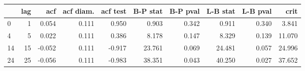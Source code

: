 \begin{tabular}{lrrrrrrrrr}
\toprule
{} &  lag &    acf &  acf diam. &  acf test &  B-P stat &  B-P pval &  L-B stat &  L-B pval &    crit \\
\midrule
0  &    1 &  0.054 &      0.111 &     0.950 &     0.903 &     0.342 &     0.911 &     0.340 &   3.841 \\
4  &    5 &  0.022 &      0.111 &     0.386 &     8.178 &     0.147 &     8.329 &     0.139 &  11.070 \\
14 &   15 & -0.052 &      0.111 &    -0.917 &    23.761 &     0.069 &    24.481 &     0.057 &  24.996 \\
24 &   25 & -0.056 &      0.111 &    -0.983 &    38.351 &     0.043 &    40.250 &     0.027 &  37.652 \\
\bottomrule
\end{tabular}
